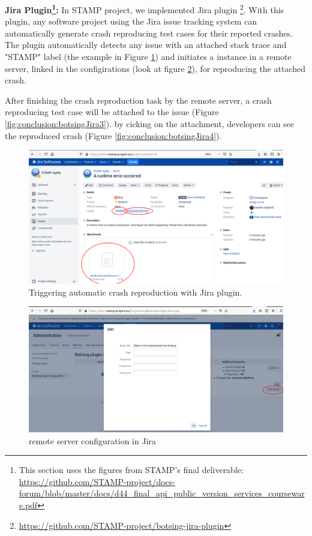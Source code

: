 \textbf{\botsing Jira Plugin\footnote{This section uses the figures from STAMP's final deliverable: \url{https://github.com/STAMP-project/docs-forum/blob/master/docs/d44_final_api_public_version_services_courseware.pdf}}:}
In STAMP project, we implemented \botsing Jira plugin \footnote{\url{https://github.com/STAMP-project/botsing-jira-plugin}}.
With this plugin, any software project using the Jira issue tracking system can automatically generate crash reproducing test cases for their reported crashes. The plugin automatically detects any issue with an attached stack trace and "STAMP" label (\eg the example in Figure \ref{fig:conclusion:botsingJira1}) and initiates a \botsing instance in a remote server, linked in the configirations (look at figure \ref{fig:conclusion:botsingJira2}), for reproducing the attached crash. 


After finishing the crash reproduction task by the remote server, a crash reproducing test case will be attached to the issue (Figure \ref{fig:conclusion:botsingJira3}). by cicking on the attachment, developers can see the reproduced crash (Figure \ref{fig:conclusion:botsingJira4}).
\begin{figure}
    \includegraphics[width=\textwidth]{conclusion/figures/deliverables_wp4_d44_images_jira-doing-reproduction.png}
    \caption{Triggering automatic crash reproduction with \botsing Jira plugin.}
    \label{fig:conclusion:botsingJira1}
\end{figure}

\begin{figure}
    \includegraphics[width=\textwidth]{conclusion/figures/deliverables_wp4_d44_images_jira-botsing-server-configuration.png}
    \caption{\botsing remote server configuration in Jira}
    \label{fig:conclusion:botsingJira2}
\end{figure}


